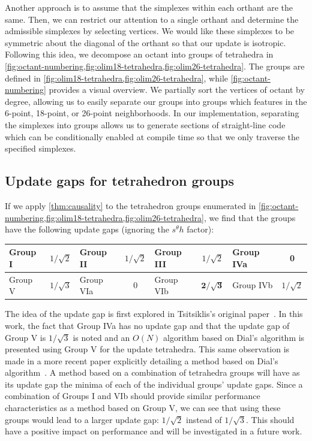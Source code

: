 \documentclass[eikonal.tex]{subfiles}
\begin{document}
Another approach is to assume that the simplexes within each orthant
are the same. Then, we can restrict our attention to a single orthant
and determine the admissible simplexes by selecting vertices. We would
like these simplexes to be symmetric about the diagonal of the orthant
so that our update is isotropic. Following this idea, we decompose an
octant into groups of tetrahedra in
\cref{fig:octant-numbering,fig:olim18-tetrahedra,fig:olim26-tetrahedra}. The
groups are defined in
\cref{fig:olim18-tetrahedra,fig:olim26-tetrahedra}, while
\cref{fig:octant-numbering} provides a visual overview. We partially
sort the vertices of octant by degree, allowing us to easily separate
our groups into groups which features in the 6-point, 18-point, or
26-point neighborhoods. In our implementation, separating the
simplexes into groups allows us to generate sections of straight-line
code which can be conditionally enabled at compile time so that we
only traverse the specified simplexes.

\subsection{Update gaps for tetrahedron groups}

If we apply \cref{thm:causality} to the tetrahedron groups enumerated
in
\cref{fig:octant-numbering,fig:olim18-tetrahedra,fig:olim26-tetrahedra},
we find that the groups have the following update gaps (ignoring the
$s^\theta h$ factor):
\vspace{0.5em}
\begin{center}
  \begin{tabular}{lc|lc|lc|lc}
    Group I & $1/\sqrt{2}$ & Group II & $1/\sqrt{2}$ & Group III & $1/\sqrt{2}$ & Group IVa & 0 \\
    \midrule
    Group V & $1/\sqrt{3}$ & Group VIa & 0 & Group VIb & $\boldsymbol{2/\sqrt{3}}$ & Group IVb & $1/\sqrt{2}$
  \end{tabular}
\end{center}
\vspace{0.5em} The idea of the update gap is first explored in
Tsitsiklis's original paper~\cite{tsitsiklis1995efficient}. In this
work, the fact that Group IVa has no update gap and that the update
gap of Group V is $1/\sqrt{3}$ is noted and an $O(N)$ algorithm based
on Dial's algorithm is presented using Group V for the update
tetrahedra. This same observation is made in a more recent paper
explicitly detailing a method based on Dial's
algorithm~\cite{kim2001calo}. A method based on a combination of
tetrahedra groups will have as its update gap the minima of each of
the individual groups' update gaps. Since a combination of Groups I
and VIb should provide similar performance characteristics as a method
based on Group V, we can see that using these groups would lead to a
larger update gap: $1/\sqrt{2}$ instead of $1/\sqrt{3}$. This should
have a positive impact on performance and will be investigated in a
future work.
\end{document}
